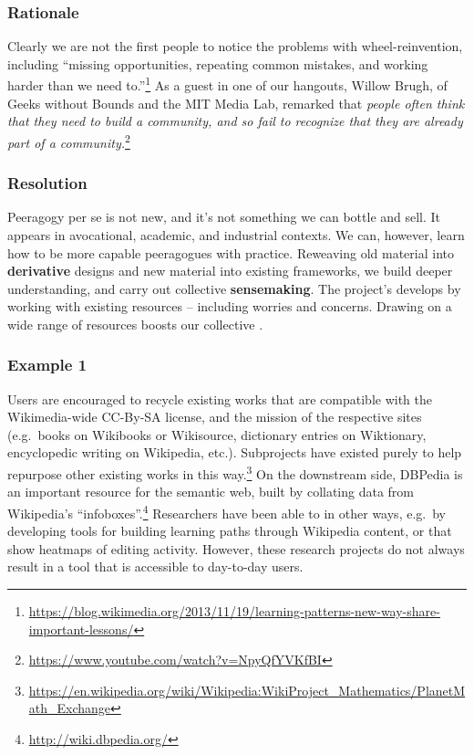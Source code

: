 \subsubsection*{Rationale} 
Clearly we are not the first people to notice the problems with wheel-reinvention, including ``missing opportunities, repeating common mistakes, and working harder than we need to.''\footnote{\url{https://blog.wikimedia.org/2013/11/19/learning-patterns-new-way-share-important-lessons/}}  As a guest in  one of our hangouts, Willow Brugh, of Geeks without Bounds and the MIT Media Lab, remarked that \emph{people often think that they need to build a community, and so fail to recognize that they are already part of a community.}\footnote{\url{https://www.youtube.com/watch?v=NpyQfYVKfBI}}



\subsubsection*{Resolution}  Peeragogy per se is not new, and it's not something we can bottle and sell.  It appears in avocational, academic, and industrial contexts.  We can, however, learn how to be more capable peeragogues with practice.  Reweaving old material into \textbf{derivative} designs and new material into existing frameworks, we build deeper understanding, and carry out collective \textbf{sensemaking}.
%
The project's  develops by working with existing resources -- including worries and concerns.
Drawing on a wide range of resources boosts our collective .

\subsubsection*{Example 1}
Users are encouraged to recycle existing works that are compatible
with the Wikimedia-wide CC-By-SA license, and the mission of the
respective sites (e.g.~books on Wikibooks or Wikisource, dictionary
entries on Wiktionary, encyclopedic writing on Wikipedia, etc.).  Subprojects have existed purely to help repurpose other existing works in this
way.\footnote{\url{https://en.wikipedia.org/wiki/Wikipedia:WikiProject_Mathematics/PlanetMath_Exchange}}  On the downstream side, DBPedia is an important resource for the
semantic web, built by collating data from Wikipedia's
``infoboxes''.\footnote{\url{http://wiki.dbpedia.org/}} Researchers
have been able to  in other ways,
e.g.~by developing tools for building learning paths through Wikipedia
content, or that show heatmaps of editing activity.  However, these
research projects do not always result in a tool that is accessible to
day-to-day users.

